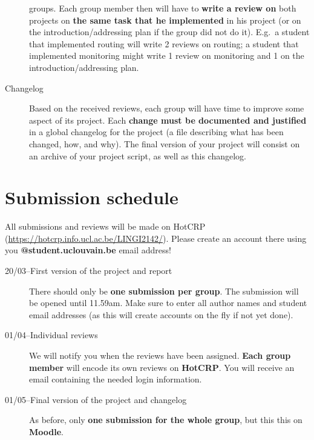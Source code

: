 \documentclass[a4paper,12pt]{article}
\begin{document}
\begin{description}
        groups. Each group member then will have to \textbf{write a review on} both
        projects on \textbf{the same task that he implemented} in his project (or on the
        introduction/addressing plan if the group did not do it). E.g.\ a
        student that implemented routing will write 2 reviews on routing; a
        student that implemented monitoring might write 1 review on monitoring
        and 1 on the introduction/addressing plan.
    \item[Changelog] Based on the received reviews, each group will have time
        to improve some aspect of its project. Each \textbf{change must be
        documented and justified} in a global changelog for the project (a file
        describing what has been changed, how, and why). The final version of
        your project will consist on an archive of your project script, as well
        as this changelog.
\end{description}

\section{Submission schedule}
All submissions and reviews will be made on HotCRP
(\url{https://hotcrp.info.ucl.ac.be/LINGI2142/}). Please create an account
there using you \textbf{@student.uclouvain.be} email address! 
\begin{description}
    \item[20/03--First version of the project and report] There should only be
        \textbf{one submission per group}. The submission will be opened
        until 11.59am. Make sure to enter all author names and student email
        addresses (as this will create accounts on the fly if not yet done).
    \item[01/04--Individual reviews] We will notify you when the reviews have
        been assigned. \textbf{Each group member} will encode its own reviews
        on \textbf{HotCRP}. You will receive an email containing the needed
        login information.
    \item[01/05--Final version of the project and changelog] As before, only
        \textbf{one submission for the whole group}, but this this on
        \textbf{Moodle}.
\end{description}
\end{document}
